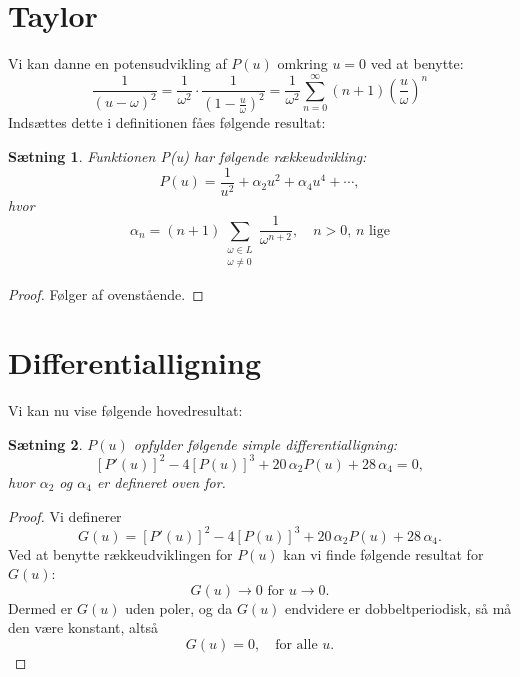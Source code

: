 \documentclass[12pt,oneside,a4paper]{article}
\newcommand{\be}{\begin{equation}}
\newcommand{\ee}{\end{equation}}
\newtheorem{thm}{Sætning}[section]
\begin{document}
\section{Taylor}

Vi kan danne en potensudvikling af $P(u)$ omkring $u=0$ ved at benytte:
\be
\frac{1}{(u-\omega)^2} = 
\frac{1}{\omega^2} \cdot \frac{1}{\left(1-\frac{u}{\omega}\right)^2} =
\frac{1}{\omega^2} \sum_{n=0}^\infty 
  (n+1) \left(\frac{u}{\omega}\right)^n
\ee
Indsættes dette i definitionen fåes følgende resultat:
\begin{thm}
    Funktionen P(u) har følgende rækkeudvikling:
\be
P(u) = \frac{1}{u^2} + \alpha_2 u^2 + \alpha_4 u^4 + \cdots,
\ee
hvor
\be
\alpha_n = (n+1) \sum_{\substack{\omega\in L\\ \omega\neq 0}} \frac{1}{\omega^{n+2}},
\quad \mbox{$n>0$, $n$ lige}
\label{alphan}
\ee
\end{thm}
\begin{proof}
    Følger af ovenstående.
\end{proof}

\section{Differentialligning}
Vi kan nu vise følgende hovedresultat:
\begin{thm}
$P(u)$ opfylder følgende simple differentialligning:
\be
\left[P'(u)\right]^2 - 4 \left[P(u)\right]^3
+ 20\,\alpha_2 P(u) + 28\,\alpha_4 = 0,
\label{pmu}
\ee
hvor $\alpha_2$ og $\alpha_4$ er defineret oven for.
\end{thm}
\begin{proof}
Vi definerer
\be
G(u) = \left[P'(u)\right]^2 - 4 \left[P(u)\right]^3
+ 20\,\alpha_2 P(u) + 28\,\alpha_4.
\ee
Ved at benytte rækkeudviklingen for $P(u)$ kan vi finde følgende
resultat for $G(u)$:
$$
G(u) \rightarrow 0 \mbox{ for } u \rightarrow 0.
$$
Dermed er $G(u)$ uden poler, og da $G(u)$ endvidere er dobbeltperiodisk,
så må den være konstant, altså
$$
G(u) = 0, \quad \mbox{for alle $u$.}
$$
\end{proof}
\end{document}

